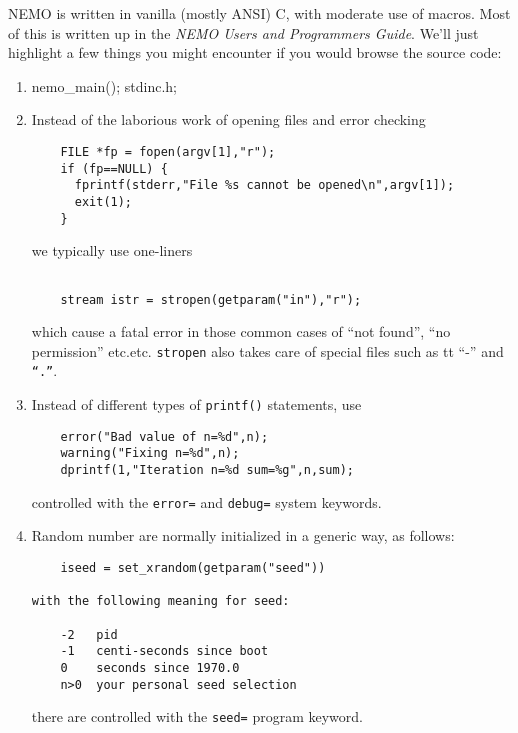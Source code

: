 NEMO is written in vanilla (mostly ANSI) C, with moderate use of
macros. Most of this is written up in the 
{\it NEMO Users and Programmers Guide}. We'll just highlight a few 
things you might encounter if you would browse the source code:

\begin{enumerate}

\item
nemo\_main(); stdinc.h;

\item
Instead of the laborious work of opening files and error checking

\footnotesize\begin{verbatim}
    FILE *fp = fopen(argv[1],"r");
    if (fp==NULL) {
      fprintf(stderr,"File %s cannot be opened\n",argv[1]);
      exit(1);
    }
\end{verbatim}\normalsize

we typically use one-liners
\footnotesize\begin{verbatim}

    stream istr = stropen(getparam("in"),"r");
\end{verbatim}\normalsize
which cause a fatal error 
in those common cases of ``not found'', ``no permission'' etc.etc.
{\tt stropen} also takes care of special files such as {tt ``-''} and {\tt ``.''}.

\item
Instead of different types of {\tt printf()} statements, use
\footnotesize\begin{verbatim}
    error("Bad value of n=%d",n);
    warning("Fixing n=%d",n);
    dprintf(1,"Iteration n=%d sum=%g",n,sum);
\end{verbatim}\normalsize
controlled with the {\tt error=} and {\tt debug=} system keywords.

\item
Random number are normally initialized in a generic way, as follows:
\footnotesize\begin{verbatim}
    iseed = set_xrandom(getparam("seed"))

with the following meaning for seed:

    -2   pid
    -1   centi-seconds since boot
    0    seconds since 1970.0
    n>0  your personal seed selection
\end{verbatim}\normalsize

there are controlled with the  {\tt seed=} program keyword.


\end{enumerate}

